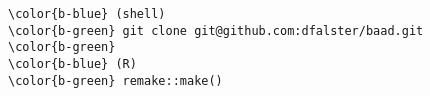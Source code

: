 \documentclass[class=minimal,border=0]{standalone}
\begin{document}
%
\begin{BVerbatim}[bgcolor=b-darkgrey]
\color{b-blue} (shell)
\color{b-green} git clone git@github.com:dfalster/baad.git
\color{b-green}
\color{b-blue} (R)
\color{b-green} remake::make()
\end{BVerbatim}
\end{document}
